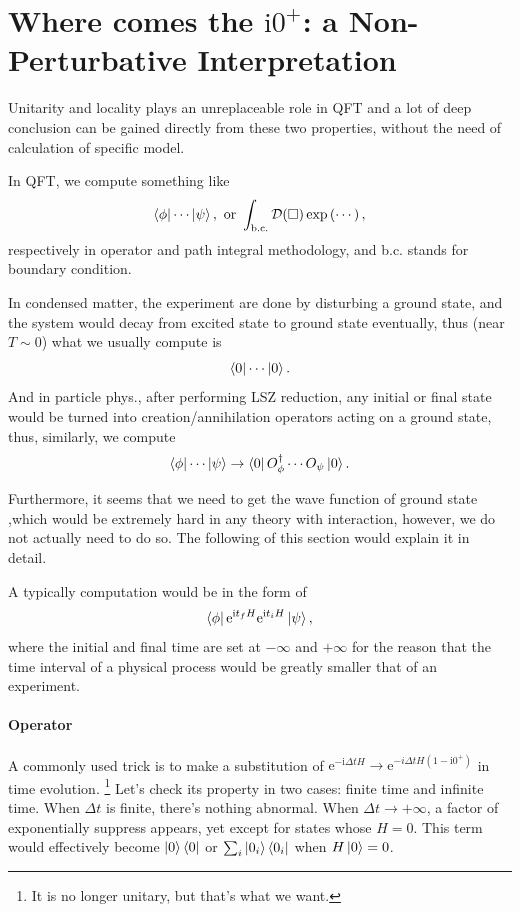 
\section[The Origin of $\mathrm{i} 0^{+}$]{Where comes the $ \mathrm{i} 0^{+}$: a Non-Perturbative Interpretation}
Unitarity and locality plays an unreplaceable role in QFT and a lot of deep conclusion can be gained directly from these two properties, without the need of calculation of specific model.

In QFT, we compute something like
\begin{equation}
  \bra{\phi} \cdots \ket{\psi}, \ \text{or}\ \int_{\text{b.c.}} \mathcal{D} (\square)  \exp \left( \cdots \right) ,
\end{equation}
respectively in operator and path integral methodology, and b.c. stands for boundary condition.

In condensed matter, the experiment are done by disturbing a ground state, and the system would decay from excited state to ground state eventually, thus (near $T \sim 0$) what we usually compute is
\begin{equation}
   \bra{0} \cdots \ket{0}.
\end{equation}
And in particle phys., after performing LSZ reduction, any initial or final state would be turned into creation/annihilation operators acting on a ground state, thus, similarly, we compute
\begin{equation}
  \bra{\phi}\cdots \ket{\psi} \to  \bra{0} O^{\dagger}_{\phi} \cdots O_{\psi}\ket{0}.
\end{equation}

Furthermore, it seems that we need to get the wave function of ground state ,which would be extremely hard in any theory with interaction, however, we do not actually need to do so. The following of this section would explain it in detail.

A typically computation would be in the form of
\begin{equation}
  \bra{\phi} \mathrm{e}^{ \mathrm{i} t_f H} \mathrm{e}^{\mathrm{i}  t_i H} \ket{\psi},
\end{equation}
where the initial and final time are set at $-\infty$ and $+\infty$ for the reason that the time interval of a physical process would be greatly smaller that of an experiment.

\paragraph{Operator}
A commonly used trick is to make a substitution of $\mathrm{e}^{- \mathrm{i} \Delta t H} \to \mathrm{e}^{- i\Delta t H \left( 1- \mathrm{i}  0^{+} \right) }$ in time evolution. \footnote{It is no longer unitary, but that's what we want.}
Let's check its property in two cases: finite time and infinite time.
When $\Delta t$ is finite, there's nothing abnormal. When $\Delta t \to  + \infty$, a factor of exponentially suppress appears, yet except for states whose $H = 0$. This term would effectively become $\ket{0} \bra{0}$ or $\sum_i \ket{0_{i}} \bra{0_{i}}$ when $H \ket{0} = 0$.

